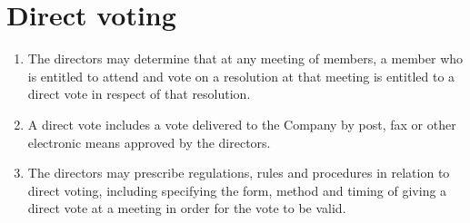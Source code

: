 \section{Direct voting}

\begin{enumerate}[label=(\alph*)]
    \item The directors may determine that at any meeting of members, a member who is entitled to attend and vote on a resolution at that meeting is entitled to a direct vote in respect of that resolution.
    
    \item A direct vote includes a vote delivered to the Company by post, fax or other electronic means approved by the directors.
    
    \item The directors may prescribe regulations, rules and procedures in relation to direct voting, including specifying the form, method and timing of giving a direct vote at a meeting in order for the vote to be valid.
\end{enumerate} 